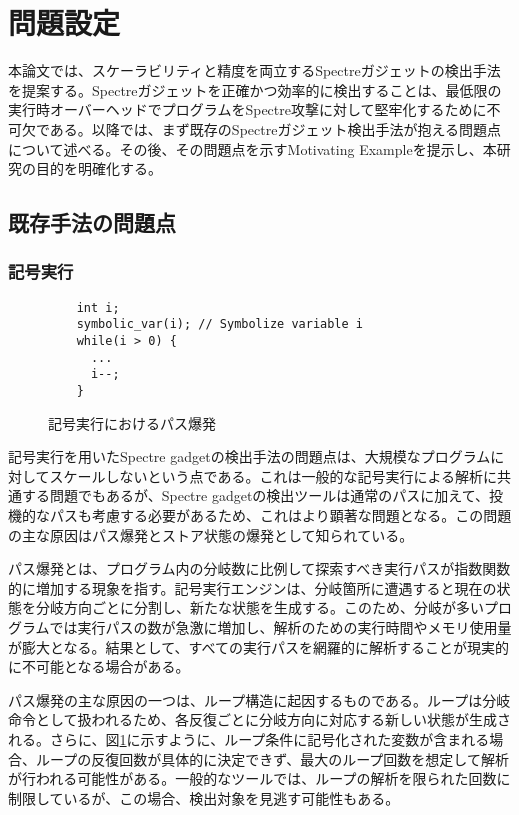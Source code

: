 \section{問題設定}
本論文では、スケーラビリティと精度を両立するSpectreガジェットの検出手法を提案する。Spectreガジェットを正確かつ効率的に検出することは、最低限の実行時オーバーヘッドでプログラムをSpectre攻撃に対して堅牢化するために不可欠である。以降では、まず既存のSpectreガジェット検出手法が抱える問題点について述べる。その後、その問題点を示すMotivating Exampleを提示し、本研究の目的を明確化する。

\subsection{既存手法の問題点}

\subsubsection{記号実行}

\begin{figure}
  \begin{verbatim}
    int i;
    symbolic_var(i); // Symbolize variable i
    while(i > 0) {
      ...
      i--;
    }
\end{verbatim}
  \caption{記号実行におけるパス爆発}
  \label{path_explosion}
\end{figure}



記号実行を用いたSpectre gadgetの検出手法\cite{guarnieri2020spectector,wang2020kleespectre}の問題点は、大規模なプログラムに対してスケールしないという点である。これは一般的な記号実行による解析に共通する問題でもあるが、Spectre gadgetの検出ツールは通常のパスに加えて、投機的なパスも考慮する必要があるため、これはより顕著な問題となる。この問題の主な原因はパス爆発とストア状態の爆発として知られている\cite{baldoni2018survey}。\par

パス爆発とは、プログラム内の分岐数に比例して探索すべき実行パスが指数関数的に増加する現象を指す。記号実行エンジンは、分岐箇所に遭遇すると現在の状態を分岐方向ごとに分割し、新たな状態を生成する。このため、分岐が多いプログラムでは実行パスの数が急激に増加し、解析のための実行時間やメモリ使用量が膨大となる。結果として、すべての実行パスを網羅的に解析することが現実的に不可能となる場合がある。\par

パス爆発の主な原因の一つは、ループ構造に起因するものである。ループは分岐命令として扱われるため、各反復ごとに分岐方向に対応する新しい状態が生成される。さらに、図\ref{path_explosion}に示すように、ループ条件に記号化された変数が含まれる場合、ループの反復回数が具体的に決定できず、最大のループ回数を想定して解析が行われる可能性がある。一般的なツールでは、ループの解析を限られた回数に制限しているが、この場合、検出対象を見逃す可能性もある。\par

